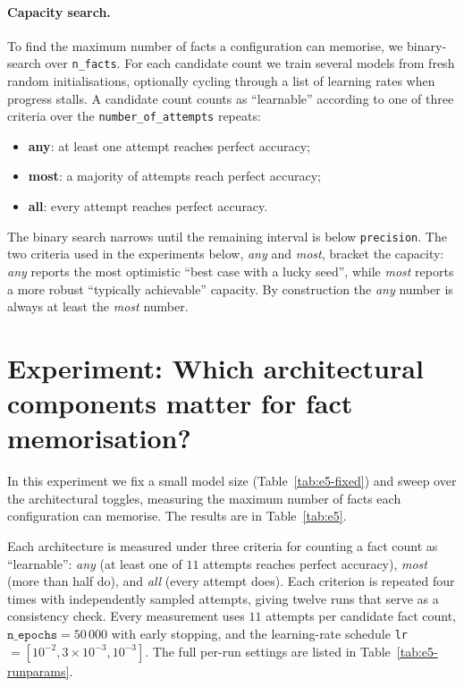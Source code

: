 \documentclass[11pt,a4paper]{article}
\begin{document}
\paragraph{Capacity search.}
To find the maximum number of facts a configuration can memorise, we binary-search over \texttt{n\_facts}. For each candidate count we train several models from fresh random initialisations, optionally cycling through a list of learning rates when progress stalls. A candidate count counts as ``learnable'' according to one of three criteria over the \texttt{number\_of\_attempts} repeats:
\begin{itemize}[nosep]
    \item \textbf{any}: at least one attempt reaches perfect accuracy;
    \item \textbf{most}: a majority of attempts reach perfect accuracy;
    \item \textbf{all}: every attempt reaches perfect accuracy.
\end{itemize}
The binary search narrows until the remaining interval is below \texttt{precision}. The two criteria used in the experiments below, \emph{any} and \emph{most}, bracket the capacity: \emph{any} reports the most optimistic ``best case with a lucky seed'', while \emph{most} reports a more robust ``typically achievable'' capacity. By construction the \emph{any} number is always at least the \emph{most} number.

\section{Experiment: Which architectural components matter for fact memorisation?}
\label{sec:e5}

In this experiment we fix a small model size (Table~\ref{tab:e5-fixed}) and sweep over the architectural toggles, measuring the maximum number of facts each configuration can memorise. The results are in Table~\ref{tab:e5}.

Each architecture is measured under three criteria for counting a fact count as ``learnable'': \emph{any} (at least one of $11$ attempts reaches perfect accuracy), \emph{most} (more than half do), and \emph{all} (every attempt does). Each criterion is repeated four times with independently sampled attempts, giving twelve runs that serve as a consistency check. Every measurement uses $11$ attempts per candidate fact count, $\texttt{n\_epochs} = 50\,000$ with early stopping, and the learning-rate schedule \texttt{lr}$=[10^{-2}, 3\times10^{-3}, 10^{-3}]$. The full per-run settings are listed in Table~\ref{tab:e5-runparams}.
\end{document}
